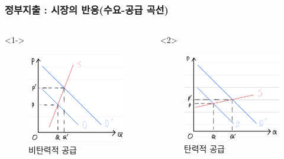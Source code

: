 \documentclass[aspectratio=169,xcolor=dvipsnames,handout]{beamer}
\begin{document}
\begin{frame}
\frametitle{정부지출 : 시장의 반응(수요-공급 곡선)}
    \begin{columns}
        \begin{column}{.5\textwidth}<1->
            \begin{figure}
                \centering
                \includegraphics[width=.8\textwidth]{pic/helasup.png}
                \caption{비탄력적 공급}
            \end{figure}
        \end{column}
        \begin{column}{.5\textwidth}<2>
            \begin{figure}
                \centering
                \includegraphics[width=.8\textwidth]{pic/lelasup.png}
                \caption{탄력적 공급}
            \end{figure}
        \end{column}
    \end{columns}
\end{frame}
\end{document}
